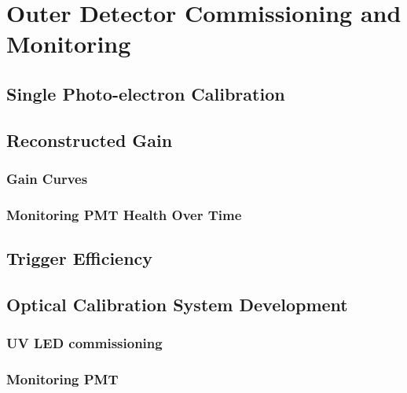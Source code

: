 \chapter{Outer Detector Commissioning and Monitoring}\label{chap:ODCommissioning}
\section{Single Photo-electron Calibration}

\section{Reconstructed Gain}
\subsection{Gain Curves}
\subsection{Monitoring PMT Health Over Time}

\section{Trigger Efficiency}

\section{Optical Calibration System Development}
\subsection{UV LED commissioning}

\subsection{Monitoring PMT}